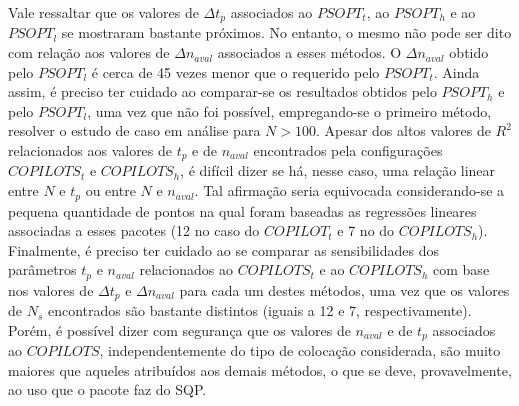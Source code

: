 Vale ressaltar que os valores de $\Delta t_p$ associados ao $PSOPT_t$, ao $PSOPT_h$ e ao $PSOPT_l$ se mostraram bastante próximos. No entanto, o mesmo não pode ser dito com relação aos valores de $\Delta n_{aval}$ associados a esses métodos. O $\Delta n_{aval}$ obtido pelo  $PSOPT_l$ é cerca de 45 vezes menor que o requerido pelo $PSOPT_t$. Ainda assim, é preciso ter cuidado ao comparar-se os resultados obtidos pelo $PSOPT_h$ e pelo $PSOPT_l$, uma vez que não foi possível, empregando-se o primeiro método, resolver o estudo de caso em análise para $N > 100$. Apesar dos altos valores de $R^2$ relacionados aos valores de $t_p$ e de $n_{aval}$ encontrados pela configurações $COPILOTS_t$ e  $COPILOTS_h$, é difícil dizer se há, nesse caso, uma relação linear entre $N$ e $t_p$ ou entre $N$ e $n_{aval}$. Tal afirmação seria equivocada considerando-se a pequena quantidade de pontos na qual foram baseadas as regressões lineares associadas a esses pacotes (12 no caso do $COPILOT_t$ e 7 no do $COPILOTS_h$). Finalmente, é preciso ter cuidado ao se comparar as sensibilidades dos parâmetros $t_p$ e $n_{aval}$ relacionados ao $COPILOTS_t$ e ao $COPILOTS_h$ com base nos valores de $\Delta t_p$ e $\Delta n_{aval}$ para cada um destes métodos, uma vez que os valores de $N_s$ encontrados são bastante distintos (iguais a 12 e 7, respectivamente). Porém, é possível dizer com segurança que os valores de $n_{aval}$ e de $t_p$ associados ao $COPILOTS$, independentemente do tipo de colocação considerada, são muito maiores que aqueles atribuídos aos demais métodos, o que se deve, provavelmente, ao uso que o pacote faz do SQP.

